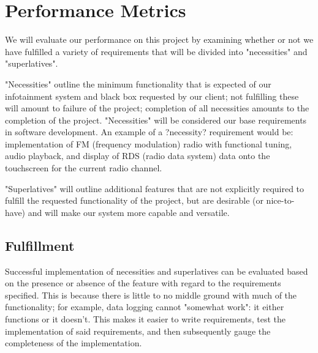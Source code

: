 \documentclass[onecolumn, draftclsnofoot,10pt, compsoc]{IEEEtran}
\begin{document}
\section{Performance Metrics}
We will evaluate our performance on this project by examining whether or not we have fulfilled a variety of requirements that will be divided into "necessities" and "superlatives".\par
"Necessities" outline the minimum functionality that is expected of our infotainment system and black box requested by our client; not fulfilling these will amount to failure of the project; completion of all necessities amounts to the completion of the project. "Necessities" will be considered our base requirements in software development. An example of a ?necessity? requirement would be: implementation of FM (frequency modulation) radio with functional tuning, audio playback, and display of RDS (radio data system) data onto the touchscreen for the current radio channel.\par
"Superlatives" will outline additional features that are not explicitly required to fulfill the requested functionality of the project, but are desirable (or nice-to-have) and will make our system more capable and versatile.\par

\subsection{Fulfillment}
Successful implementation of necessities and superlatives can be evaluated based on the presence or absence of the feature with regard to the requirements specified. This is because there is little to no middle ground with much of the functionality; for example, data logging cannot "somewhat work": it either functions or it doesn't. This makes it easier to write requirements, test the implementation of said requirements, and then subsequently gauge the completeness of the implementation.
\end{document}
